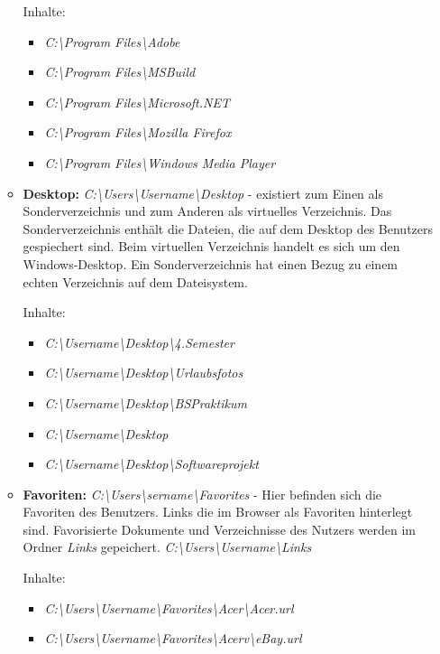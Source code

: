 \begin{itemize}
\begin{itemize}
	Inhalte:
	\begin{itemize}
		\item \textit{C:\textbackslash Program Files\textbackslash Adobe}
		\item \textit{C:\textbackslash Program Files\textbackslash MSBuild}
		\item \textit{C:\textbackslash Program Files\textbackslash Microsoft.NET}
		\item \textit{C:\textbackslash Program Files\textbackslash Mozilla Firefox}
		\item \textit{C:\textbackslash Program Files\textbackslash Windows Media Player}
\end{itemize}
\item \textbf{Desktop:}	 \textit{C:\textbackslash Users\textbackslash Username\textbackslash Desktop} -
	existiert zum Einen als Sonderverzeichnis und zum Anderen als virtuelles Verzeichnis.
	Das Sonderverzeichnis enthält die Dateien, die auf dem Desktop des Benutzers gespiechert sind.
	Beim virtuellen Verzeichnis handelt es sich um den Windows-Desktop. Ein Sonderverzeichnis hat einen
	Bezug zu einem echten Verzeichnis auf dem Dateisystem.

	Inhalte:
	\begin{itemize}
	\item \textit{C:\textbackslash Username\textbackslash Desktop\textbackslash4.Semester}
	\item \textit{C:\textbackslash Username\textbackslash Desktop\textbackslash Urlaubsfotos}
	\item \textit{ C:\textbackslash Username\textbackslash Desktop\textbackslash BSPraktikum }
	\item \textit{ C:\textbackslash Username\textbackslash Desktop }
	\item \textit{ C:\textbackslash Username\textbackslash Desktop\textbackslash Softwareprojekt }
\end{itemize}

\item \textbf{Favoriten:}	\textit{C:\textbackslash Users\textbackslash sername\textbackslash Favorites} -
	Hier befinden sich die Favoriten des Benutzers. Links die im Browser als Favoriten
	hinterlegt sind. Favorisierte Dokumente und Verzeichnisse des Nutzers werden im Ordner \textit{Links}
	gepeichert. \textit{C:\textbackslash Users\textbackslash Username\textbackslash Links}

	Inhalte:
	\begin{itemize}
	\item \textit{C:\textbackslash Users\textbackslash Username\textbackslash Favorites\textbackslash Acer\textbackslash Acer.url}
	\item \textit{C:\textbackslash Users\textbackslash Username\textbackslash Favorites\textbackslash Acerv\textbackslash eBay.url}
\end{itemize}


\end{itemize}
\end{itemize}
